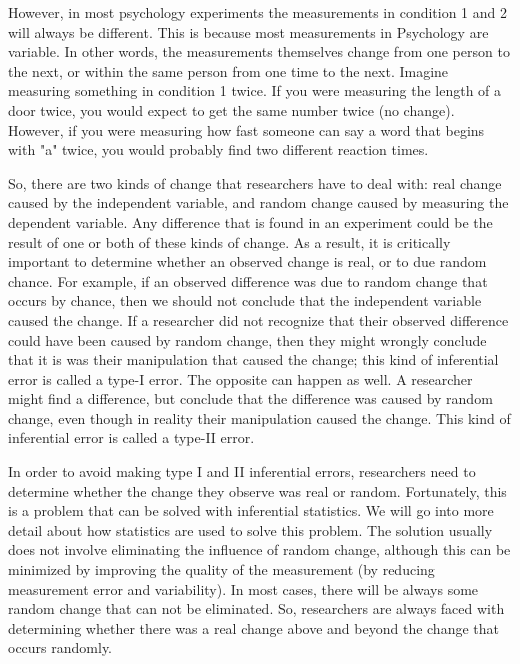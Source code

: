 However, in most psychology experiments the measurements in condition 1 and 2 will always be different. This is because most measurements in Psychology are variable. In other words, the measurements themselves change from one person to the next, or within the same person from one time to the next. Imagine measuring something in condition 1 twice. If you were measuring the length of a door twice, you would expect to get the same number twice (no change). However, if you were measuring how fast someone can say a word that begins with "a" twice, you would probably find two different reaction times.

So, there are two kinds of change that researchers have to deal with: real change caused by the independent variable, and random change caused by measuring the dependent variable. Any difference that is found in an experiment could be the result of one or both of these kinds of change. As a result, it is critically important to determine whether an observed change is real, or to due random chance. For example, if an observed difference was due to random change that occurs by chance, then we should not conclude that the independent variable caused the change. If a researcher did not recognize that their observed difference could have been caused by random change, then they might wrongly conclude that it is was their manipulation that caused the change; this kind of inferential error is called a type-I error. The opposite can happen as well. A researcher might find a difference, but conclude that the difference was caused by random change, even though in reality their manipulation caused the change. This kind of inferential error is called a type-II error.

In order to avoid making type I and II inferential errors, researchers need to determine whether the change they observe was real or random. Fortunately, this is a problem that can be solved with inferential statistics. We will go into more detail about how statistics are used to solve this problem. The solution usually does not involve eliminating the influence of random change, although this can be minimized by improving the quality of the measurement (by reducing measurement error and variability). In most cases, there will be always some random change that can not be eliminated. So, researchers are always faced with determining whether there was a real change above and beyond the change that occurs randomly.

